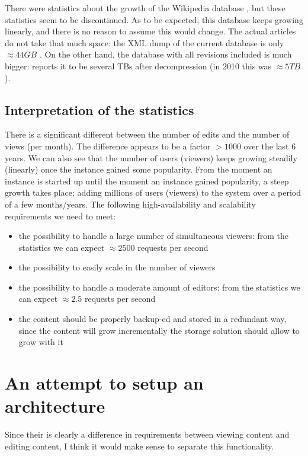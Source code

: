 \documentclass[12pt]{report}
\begin{document}
There were statistics about the growth of the Wikipedia database
\cite{wikipedia_database_growth}, but these statistics seem to be
discontinued. As to be expected, this database keeps growing linearly,
and there is no reason to assume this would change.
The actual articles do not take that much space: the XML dump of the
current database is only $\approx 44 GB$ \cite{wikipedia_size}. 
On the other hand, the database with all
revisions included is much bigger: \cite{wikipedia_size} reports it to be several
TBs after decompression (in 2010 this was $\approx 5TB$ \cite{wikipedia_full_size}).

\subsection{Interpretation of the statistics}
There is a significant different between the number of edits and the
number of views (per month).
The difference appears to be a factor $>1000$ over the last 6 years.
We can also see that the number of users (viewers) keeps growing
steadily (linearly) once the instance gained some popularity. 
From the moment an instance is started up until the moment an
instance gained popularity, a steep growth takes place; adding
millions of users (viewers) to the system over a period of a few
months/years.
The following high-availability and scalability requirements we need to meet:
\begin{itemize}
\item the possibility to handle a large number of
  simultaneous viewers: from the statistics we can expect $\approx 2500$
  requests per second
\item the possibility to easily scale in the number of viewers
\item the possibility to handle a moderate amount of editors: from the
  statistics we can expect $\approx 2.5$ requests per second
\item the content should be properly backup-ed and stored in a
  redundant way, since the content will grow incrementally the storage
  solution should allow to grow with it
\end{itemize}

\section{An attempt to setup an architecture}
Since their is clearly a difference in requirements between viewing content and
editing content, I think it would make sense to separate this
functionality.
\end{document}
